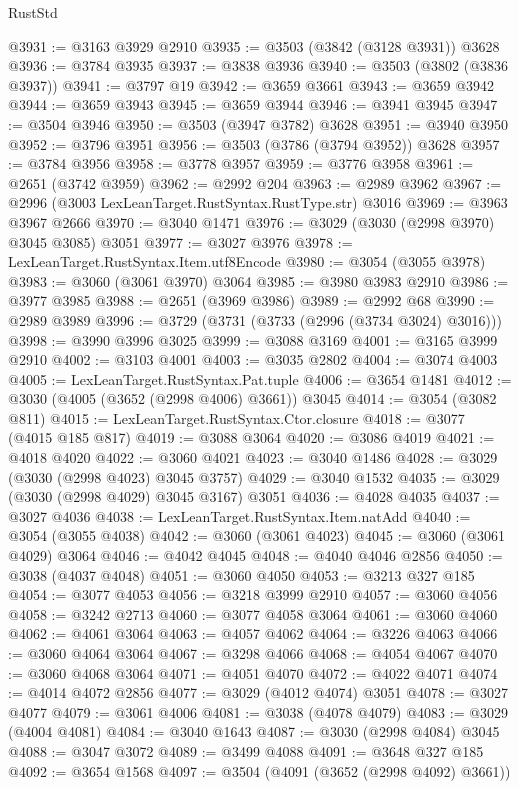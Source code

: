 \begin{lexlean}{RustStd}
\begin{coremodule}
@3931 := @3163 @3929 @2910
@3935 := @3503 (@3842 (@3128 @3931)) @3628
@3936 := @3784 @3935
@3937 := @3838 @3936
@3940 := @3503 (@3802 (@3836 @3937))
@3941 := @3797 @19
@3942 := @3659 @3661
@3943 := @3659 @3942
@3944 := @3659 @3943
@3945 := @3659 @3944
@3946 := @3941 @3945
@3947 := @3504 @3946
@3950 := @3503 (@3947 @3782) @3628
@3951 := @3940 @3950
@3952 := @3796 @3951
@3956 := @3503 (@3786 (@3794 @3952)) @3628
@3957 := @3784 @3956
@3958 := @3778 @3957
@3959 := @3776 @3958
@3961 := @2651 (@3742 @3959)
@3962 := @2992 @204
@3963 := @2989 @3962
@3967 := @2996 (@3003 LexLeanTarget.RustSyntax.RustType.str) @3016
@3969 := @3963 @3967 @2666
@3970 := @3040 @1471
@3976 := @3029 (@3030 (@2998 @3970) @3045 @3085) @3051
@3977 := @3027 @3976
@3978 := LexLeanTarget.RustSyntax.Item.utf8Encode
@3980 := @3054 (@3055 @3978)
@3983 := @3060 (@3061 @3970) @3064
@3985 := @3980 @3983 @2910
@3986 := @3977 @3985
@3988 := @2651 (@3969 @3986)
@3989 := @2992 @68
@3990 := @2989 @3989
@3996 := @3729 (@3731 (@3733 (@2996 (@3734 @3024) @3016)))
@3998 := @3990 @3996 @3025
@3999 := @3088 @3169
@4001 := @3165 @3999 @2910
@4002 := @3103 @4001
@4003 := @3035 @2802
@4004 := @3074 @4003
@4005 := LexLeanTarget.RustSyntax.Pat.tuple
@4006 := @3654 @1481
@4012 := @3030 (@4005 (@3652 (@2998 @4006) @3661)) @3045
@4014 := @3054 (@3082 @811)
@4015 := LexLeanTarget.RustSyntax.Ctor.closure
@4018 := @3077 (@4015 @185 @817)
@4019 := @3088 @3064
@4020 := @3086 @4019
@4021 := @4018 @4020
@4022 := @3060 @4021
@4023 := @3040 @1486
@4028 := @3029 (@3030 (@2998 @4023) @3045 @3757)
@4029 := @3040 @1532
@4035 := @3029 (@3030 (@2998 @4029) @3045 @3167) @3051
@4036 := @4028 @4035
@4037 := @3027 @4036
@4038 := LexLeanTarget.RustSyntax.Item.natAdd
@4040 := @3054 (@3055 @4038)
@4042 := @3060 (@3061 @4023)
@4045 := @3060 (@3061 @4029) @3064
@4046 := @4042 @4045
@4048 := @4040 @4046 @2856
@4050 := @3038 (@4037 @4048)
@4051 := @3060 @4050
@4053 := @3213 @327 @185
@4054 := @3077 @4053
@4056 := @3218 @3999 @2910
@4057 := @3060 @4056
@4058 := @3242 @2713
@4060 := @3077 @4058 @3064
@4061 := @3060 @4060
@4062 := @4061 @3064
@4063 := @4057 @4062
@4064 := @3226 @4063
@4066 := @3060 @4064 @3064
@4067 := @3298 @4066
@4068 := @4054 @4067
@4070 := @3060 @4068 @3064
@4071 := @4051 @4070
@4072 := @4022 @4071
@4074 := @4014 @4072 @2856
@4077 := @3029 (@4012 @4074) @3051
@4078 := @3027 @4077
@4079 := @3061 @4006
@4081 := @3038 (@4078 @4079)
@4083 := @3029 (@4004 @4081)
@4084 := @3040 @1643
@4087 := @3030 (@2998 @4084) @3045
@4088 := @3047 @3072
@4089 := @3499 @4088
@4091 := @3648 @327 @185
@4092 := @3654 @1568
@4097 := @3504 (@4091 (@3652 (@2998 @4092) @3661))

\end{coremodule}
\end{lexlean}
